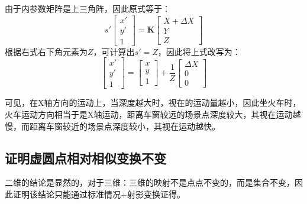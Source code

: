 \documentclass[11pt]{article}
\begin{document}
由于内参数矩阵是上三角阵，因此原式等于：
\begin{equation*}
  s'\begin{bmatrix}
    x' \\y'\\1
  \end{bmatrix}=\mathbf{K}\begin{bmatrix}
    X+\Delta X \\Y\\Z
  \end{bmatrix}
\end{equation*}
根据右式右下角元素为$Z$，可计算出$s'=Z$，因此将上式改写为：
\begin{equation*}
  \begin{bmatrix}
    x' \\y'\\1
  \end{bmatrix}=\begin{bmatrix}
    x \\y\\1
  \end{bmatrix}+\frac{1}{Z}\begin{bmatrix}
    \Delta X \\0\\0
  \end{bmatrix}
\end{equation*}\par
可见，在X轴方向的运动上，当深度越大时，视在的运动量越小，因此坐火车时，火车运动方向相当于是X轴运动，距离车窗较远的场景点深度较大，其视在运动越慢，而距离车窗较近的场景点深度较小，其视在运动越快。
\subsection{证明虚圆点相对相似变换不变}
二维的结论是显然的，对于三维：三维的映射不是点点不变的，而是集合不变，因此证明该结论只能通过标准情况+射影变换证得。

\newpage
\printbibliography[heading=bibliography,title=参考文献]
\end{document}
